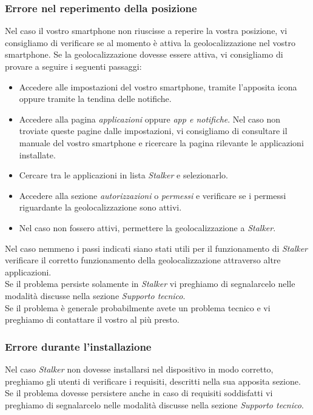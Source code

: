 \documentclass[../manuale-utente.tex]{subfiles}
\begin{document}
\subsubsection{Errore nel reperimento della posizione}
Nel caso il vostro smartphone non riuscisse a reperire la vostra posizione, vi consigliamo di verificare se al momento è attiva la geolocalizzazione nel vostro smartphone.
Se la geolocalizzazione dovesse essere attiva, vi consigliamo di provare a seguire i seguenti passaggi:
\begin{itemize}
    \item Accedere alle impostazioni del vostro smartphone, tramite l'apposita icona oppure tramite la tendina delle notifiche.
    \item Accedere alla pagina \emph{applicazioni} oppure \emph{app e notifiche}. Nel caso non troviate queste pagine dalle impostazioni, vi consigliamo di consultare
        il manuale del vostro smartphone e ricercare la pagina rilevante le applicazioni installate.
    \item Cercare tra le applicazioni in lista \emph{Stalker} e selezionarlo.
    \item Accedere alla sezione \emph{autorizzazioni} o \emph{permessi} e verificare se i permessi riguardante la geolocalizzazione sono attivi.
    \item Nel caso non fossero attivi, permettere la geolocalizzazione a \emph{Stalker}.
\end{itemize}
Nel caso nemmeno i passi indicati siano stati utili per il funzionamento di \emph{Stalker} verificare il corretto funzionamento della geolocalizzazione attraverso
altre applicazioni. \\
Se il problema persiste solamente in \emph{Stalker}  vi preghiamo di segnalarcelo nelle modalità discusse nella sezione \emph{Supporto tecnico}.\\
Se il problema è generale probabilmente avete un problema tecnico e vi preghiamo di contattare il vostro  al più presto.

\subsubsection{Errore durante l'installazione}
Nel caso \emph{Stalker} non dovesse installarsi nel dispositivo in modo corretto, preghiamo gli utenti di verificare i requisiti, descritti nella sua apposita sezione.\\
Se il problema dovesse persistere anche in caso di requisiti soddisfatti vi preghiamo di segnalarcelo nelle modalità discusse nella sezione \emph{Supporto tecnico}.
\end{document}
